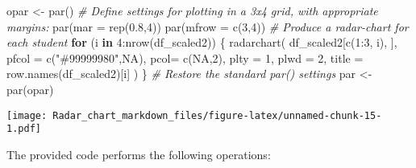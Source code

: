 \documentclass[
]{article}
\newenvironment{Shaded}{\begin{snugshade}}{\end{snugshade}}
\newcommand{\AttributeTok}[1]{\textcolor[rgb]{0.77,0.63,0.00}{#1}}
\newcommand{\CommentTok}[1]{\textcolor[rgb]{0.56,0.35,0.01}{\textit{#1}}}
\newcommand{\ConstantTok}[1]{\textcolor[rgb]{0.00,0.00,0.00}{#1}}
\newcommand{\ControlFlowTok}[1]{\textcolor[rgb]{0.13,0.29,0.53}{\textbf{#1}}}
\newcommand{\DecValTok}[1]{\textcolor[rgb]{0.00,0.00,0.81}{#1}}
\newcommand{\FloatTok}[1]{\textcolor[rgb]{0.00,0.00,0.81}{#1}}
\newcommand{\FunctionTok}[1]{\textcolor[rgb]{0.00,0.00,0.00}{#1}}
\newcommand{\NormalTok}[1]{#1}
\newcommand{\OtherTok}[1]{\textcolor[rgb]{0.56,0.35,0.01}{#1}}
\newcommand{\SpecialCharTok}[1]{\textcolor[rgb]{0.00,0.00,0.00}{#1}}
\newcommand{\StringTok}[1]{\textcolor[rgb]{0.31,0.60,0.02}{#1}}
\begin{document}
\begin{Shaded}
\begin{Highlighting}[]
\NormalTok{opar }\OtherTok{\textless{}{-}} \FunctionTok{par}\NormalTok{() }
\CommentTok{\# Define settings for plotting in a 3x4 grid, with appropriate margins:}
\FunctionTok{par}\NormalTok{(}\AttributeTok{mar =} \FunctionTok{rep}\NormalTok{(}\FloatTok{0.8}\NormalTok{,}\DecValTok{4}\NormalTok{))}
\FunctionTok{par}\NormalTok{(}\AttributeTok{mfrow =} \FunctionTok{c}\NormalTok{(}\DecValTok{3}\NormalTok{,}\DecValTok{4}\NormalTok{))}
\CommentTok{\# Produce a radar{-}chart for each student}
\ControlFlowTok{for}\NormalTok{ (i }\ControlFlowTok{in} \DecValTok{4}\SpecialCharTok{:}\FunctionTok{nrow}\NormalTok{(df\_scaled2)) \{}
  \FunctionTok{radarchart}\NormalTok{(}
\NormalTok{    df\_scaled2[}\FunctionTok{c}\NormalTok{(}\DecValTok{1}\SpecialCharTok{:}\DecValTok{3}\NormalTok{, i), ],}
    \AttributeTok{pfcol =} \FunctionTok{c}\NormalTok{(}\StringTok{"\#99999980"}\NormalTok{,}\ConstantTok{NA}\NormalTok{),}
    \AttributeTok{pcol=} \FunctionTok{c}\NormalTok{(}\ConstantTok{NA}\NormalTok{,}\DecValTok{2}\NormalTok{), }\AttributeTok{plty =} \DecValTok{1}\NormalTok{, }\AttributeTok{plwd =} \DecValTok{2}\NormalTok{,}
    \AttributeTok{title =} \FunctionTok{row.names}\NormalTok{(df\_scaled2)[i]}
\NormalTok{  )}
\NormalTok{\}}
\CommentTok{\# Restore the standard par() settings}
\NormalTok{par }\OtherTok{\textless{}{-}} \FunctionTok{par}\NormalTok{(opar) }
\end{Highlighting}
\end{Shaded}

\texttt{[image: Radar\_chart\_markdown\_files/figure-latex/unnamed-chunk-15-1.pdf]}

The provided code performs the following operations:
\end{document}
